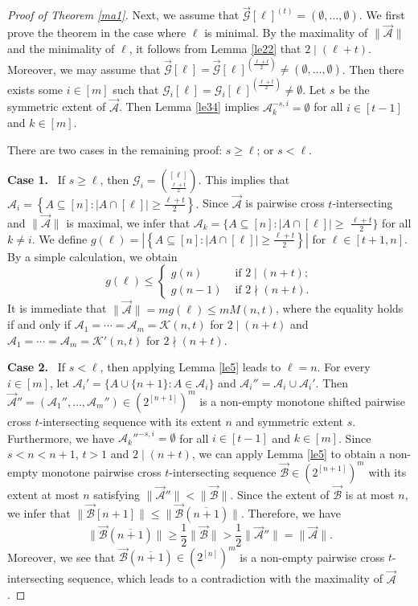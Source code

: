 \documentclass[11pt,a4paper]{article}
\begin{document}
\begin{proof}[Proof of Theorem \ref{ma1}]
Next, we assume that $\vec{\mathcal{G}}[\ell]^{(t)}=(\emptyset,\ldots,\emptyset)$.  
We first prove the theorem in the case where $\ell$ is minimal.
By the maximality of 
$\|\vec{\mathcal{A}}\|$ and  the minimality of  $\ell$, 
it follows from Lemma \ref{le22} that $2\mid (\ell+t)$. Moreover, we may assume that $\vec{\mathcal{G}}[\ell]= \vec{\mathcal{G}}[\ell]^{(\frac{\ell+t}{2})}\neq (\emptyset,\ldots,\emptyset)$.  Then there exists some $i\in [m]$ such that 
$\mathcal{G}_i[\ell]=\mathcal{G}_i[\ell]^{(\frac{\ell+t}{2})}\neq \emptyset$. 
Let  $s$ be the symmetric extent of $\vec{\mathcal{A}}$.
Then Lemma \ref{le34} implies $\mathcal{A}_{k}^{-s, i}=\emptyset$ for all $i\in [t-1]$ and $k\in [m]$.


There are two cases in the remaining proof: $s\geq  \ell$; or $s< \ell$. 

{\bf Case 1.}~  If $s\geq  \ell$, then $\mathcal{G}_i=\binom{[\ell]}{\frac{\ell+t}{2}}$. 
This implies that
$\mathcal{A}_i  =\left\{A \subseteq [n]:|A \cap[\ell]| \geq  \frac{\ell+t}{2}\right\}.$
Since $\vec{\mathcal{A}}$ is pairwise cross $t$-intersecting and $\|\vec{\mathcal{A}}\|$ is maximal, we infer that $\mathcal{A}_k  =\{A \subseteq [n]:|A \cap[\ell]| \geq$ $\frac{\ell+t}{2} \}$ for all $k\neq i$.
We define 
$g(\ell)= |\left\{A \subseteq [n]:|A \cap[\ell]| \geq  \frac{\ell+t}{2}\right\}|$ for $\ell\in [t+1,n]$.
By a simple calculation, we obtain 
$$
g(\ell)\leq \begin{cases}g(n)& \text { if } 2\mid (n+t); \\ g(n-1) &  \text { if } 2\nmid (n+t).\end{cases}
$$ 
It is immediate that 
$\|\vec{\mathcal{A}}\|= m g(\ell)\leq  m M(n, t)$, 
where the equality holds if and only if $\mathcal{A}_1=\cdots= \mathcal{A}_m= \mathcal{K}(n,t)$ for $2\mid (n+t)$  and $\mathcal{A}_1=\cdots= \mathcal{A}_m= \mathcal{K}'(n,t)$ for $2\nmid (n+t)$.


{\bf Case 2.}~  If $s< \ell$, then applying Lemma \ref{le5} leads to $\ell=n$. 
For every $i\in[m]$, let $\mathcal{A}_i'=\{A\cup \{n+1\}: A\in \mathcal{A}_i \}$ and 
$\mathcal{A}_i''=\mathcal{A}_i\cup \mathcal{A}_i'$.
Then $\vec{\mathcal{A}}'' = (\mathcal{A}_1'', \ldots, \mathcal{A}_m'')\in (2^{[n+1]})^{m}$ is a non-empty monotone shifted pairwise cross $t$-intersecting sequence with its extent $n$ and symmetric extent $s$.  Furthermore, we have $\mathcal{A}_{k}''^{-s, i}=\emptyset$ for all $i\in [t-1]$ and $k\in [m]$.
Since $s<n<n+1$, $t>1$ and $2\mid (n+t)$,  we can  apply Lemma \ref{le5} to obtain a non-empty monotone pairwise cross $t$-intersecting sequence $\vec{\mathcal{B}} \in (2^{[n+1]})^{m}$ with its extent at most $n$ satisfying $\|\vec{\mathcal{A}}''\|<\|\vec{\mathcal{B}}\|$.
Since the extent of $\vec{\mathcal{B}}$ is at most $n$, we infer that $\|\vec{\mathcal{B}}[n+1]\|\leq\|\vec{\mathcal{B}}(\overline{n+1})\|$. 
Therefore, we have 
$$\|\vec{\mathcal{B}}(\overline{n+1})\|\geq  \frac{1}{2}\|\vec{\mathcal{B}}\|> \frac{1}{2}\|\vec{\mathcal{A}}''\|=\|\vec{\mathcal{A}}\|.$$
Moreover, we see that $\vec{\mathcal{B}}(\overline{n+1})\in (2^{[n]})^{m}$
is a non-empty  pairwise cross $t$-intersecting sequence,  which leads to a contradiction with the maximality of $\vec{\mathcal{A}}$. 


\end{proof}
\end{document}
